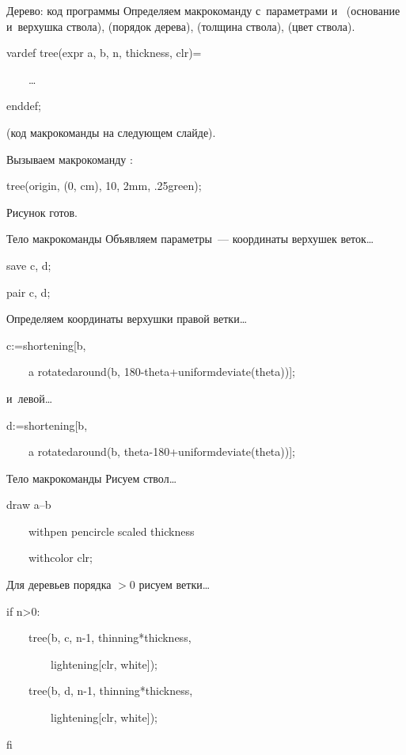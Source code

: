 \begin{frame}{Дерево: код программы}
Определяем макрокоманду  с~параметрами  и~
(основание и~верхушка ствола),  (порядок дерева),
 (толщина ствола),  (цвет ствола).
\begin{programlisting}
vardef tree(expr a, b, n, thickness, clr)=\par
~~~~…\par
enddef;
\end{programlisting}
(код макрокоманды на следующем слайде).

Вызываем макрокоманду :
\begin{programlisting}
tree(origin, (0, cm), 10, 2mm, .25green);
\end{programlisting}

Рисунок готов.
\end{frame}

\begin{frame}{Тело макрокоманды }
Объявляем параметры~— координаты верхушек веток…
\begin{programlisting}
save c, d;\par
pair c, d;
\end{programlisting}

Определяем координаты верхушки правой ветки…
\begin{programlisting}
c:=shortening[b,\par
~~~~a rotatedaround(b, 180-theta+uniformdeviate(theta))];
\end{programlisting}
и~левой…
\begin{programlisting}
d:=shortening[b,\par
~~~~a rotatedaround(b, theta-180+uniformdeviate(theta))];
\end{programlisting}
\end{frame}

\begin{frame}{Тело макрокоманды }
Рисуем ствол…
\begin{programlisting}
draw a--b\par
~~~~withpen pencircle scaled thickness\par
~~~~withcolor clr;
\end{programlisting}

Для деревьев порядка ${}>0$ рисуем ветки…
\begin{programlisting}
if n>0:\par
~~~~tree(b, c, n-1, thinning*thickness,\par
~~~~~~~~lightening[clr, white]);\par
~~~~tree(b, d, n-1, thinning*thickness,\par
~~~~~~~~lightening[clr, white]);\par
fi
\end{programlisting}
\end{frame}

